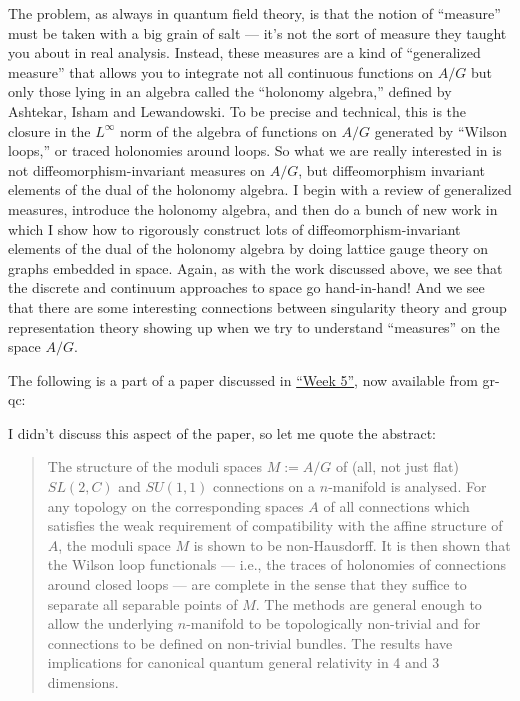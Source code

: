 \documentclass{article}
\def\tightlist{}
\renewcommand{\texttt}[1]{%
  \begingroup
  \ttfamily
  \begingroup\lccode`~=`/\lowercase{\endgroup\def~}{/\discretionary{}{}{}}%
  \begingroup\lccode`~=`[\lowercase{\endgroup\def~}{[\discretionary{}{}{}}%
  \begingroup\lccode`~=`.\lowercase{\endgroup\def~}{.\discretionary{}{}{}}%
  \catcode`/=\active\catcode`[=\active\catcode`.=\active
  \scantokens{#1\noexpand}%
  \endgroup
}
\begin{document}
The problem, as always in quantum field theory, is that the notion of
``measure'' must be taken with a big grain of salt --- it's not the sort
of measure they taught you about in real analysis. Instead, these
measures are a kind of ``generalized measure'' that allows you to
integrate not all continuous functions on \(A/G\) but only those lying
in an algebra called the ``holonomy algebra,'' defined by Ashtekar,
Isham and Lewandowski. To be precise and technical, this is the closure
in the \(L^\infty\) norm of the algebra of functions on \(A/G\)
generated by ``Wilson loops,'' or traced holonomies around loops. So
what we are really interested in is not diffeomorphism-invariant
measures on \(A/G\), but diffeomorphism invariant elements of the dual
of the holonomy algebra. I begin with a review of generalized measures,
introduce the holonomy algebra, and then do a bunch of new work in which
I show how to rigorously construct lots of diffeomorphism-invariant
elements of the dual of the holonomy algebra by doing lattice gauge
theory on graphs embedded in space. Again, as with the work discussed
above, we see that the discrete and continuum approaches to space go
hand-in-hand! And we see that there are some interesting connections
between singularity theory and group representation theory showing up
when we try to understand ``measures'' on the space \(A/G\).

The following is a part of a paper discussed in
\protect\hyperlink{week5}{``Week 5''}, now available from gr-qc:


I didn't discuss this aspect of the paper, so let me quote the abstract:

\begin{quote}
The structure of the moduli spaces \(M := A/G\) of (all, not just flat)
\(SL(2,C)\) and \(SU(1,1)\) connections on a \(n\)-manifold is analysed.
For any topology on the corresponding spaces \(A\) of all connections
which satisfies the weak requirement of compatibility with the affine
structure of \(A\), the moduli space \(M\) is shown to be non-Hausdorff.
It is then shown that the Wilson loop functionals --- i.e., the traces
of holonomies of connections around closed loops --- are complete in the
sense that they suffice to separate all separable points of \(M\). The
methods are general enough to allow the underlying \(n\)-manifold to be
topologically non-trivial and for connections to be defined on
non-trivial bundles. The results have implications for canonical quantum
general relativity in 4 and 3 dimensions.
\end{quote}
\end{document}

